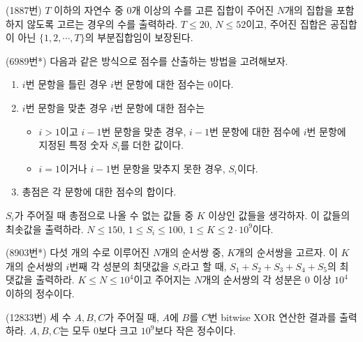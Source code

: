 \begin{problem}
    (1887번) $T$ 이하의 자연수 중 0개 이상의 수를 고른 집합이 주어진 $N$개의 집합을 포함하지 않도록 고르는 경우의 수를 출력하라. $T \leq 20$, $N \leq 52$이고, 주어진 집합은 공집합이 아닌 $\{ 1, 2, \cdots, T \}$의 부분집합임이 보장된다.
\end{problem}

\begin{problem}
    (6989번*) 다음과 같은 방식으로 점수를 산출하는 방법을 고려해보자.
    \begin{enumerate}
        \item $i$번 문항을 틀린 경우 $i$번 문항에 대한 점수는 $0$이다.
        \item $i$번 문항을 맞춘 경우 $i$번 문항에 대한 점수는
        \begin{itemize}
            \item $i>1$이고 $i-1$번 문항을 맞춘 경우, $i-1$번 문항에 대한 점수에 $i$번 문항에 지정된 특정 숫자 $S_i$를 더한 값이다.
            \item $i=1$이거나 $i-1$번 문항을 맞추지 못한 경우, $S_i$이다.
        \end{itemize}
        \item 총점은 각 문항에 대한 점수의 합이다.
    \end{enumerate}
    $S_i$가 주어질 때 총점으로 나올 수 없는 값들 중 $K$ 이상인 값들을 생각하자. 이 값들의 최솟값을 출력하라. $N \leq 150$, $1 \leq S_i \leq 100$, $1 \leq K \leq 2 \cdot 10^9$이다.
\end{problem}

\begin{problem}
    (8903번*) 다섯 개의 수로 이루어진 $N$개의 순서쌍 중, $K$개의 순서쌍을 고르자. 이 $K$개의 순서쌍의 $i$번째 각 성분의 최댓값을 $S_i$라고 할 때, $S_1+S_2+S_3+S_4+S_5$의 최댓값을 출력하라. $K \leq N \leq 10^4$이고 주어지는 $N$개의 순서쌍의 각 성분은 $0$ 이상 $10^4$ 이하의 정수이다.
\end{problem}

\begin{problem}
    (12833번) 세 수 $A, B, C$가 주어질 때, $A$에 $B$를 $C$번 bitwise XOR 연산한 결과를 출력하라. $A, B, C$는 모두 $0$보다 크고 $10^9$보다 작은 정수이다.
\end{problem}

